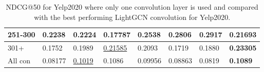 \begin{table*}[]
\begin{tabular}{|l|l|l|l|l|l|l||l|}
        251-300     & 0.2238                         & 0.2224                         & 0.17787                        & 0.2538                         & 0.2806                         & \textbf{0.2917}                 & 0.21693                    \\ \hline
        301+        & 0.1752                         & 0.1989                         & \underline{0.21585}            & 0.2093                         & 0.1719                         & 0.1880                          & \textbf{0.23305}           \\ \hline
        All con     & 0.08177                        & \underline{0.1019}             & 0.1086                         & 0.09956                        & 0.08863                        & 0.0819                          & \textbf{0.1089}            \\ \hline
    \end{tabular}
    \caption{NDCG@50 for Yelp2020 where only one convolution layer is used and compared with the best performing LightGCN convolution for Yelp2020.}
    \label{tab:yelp2020-ndcg-evaluation}
\end{table*}

